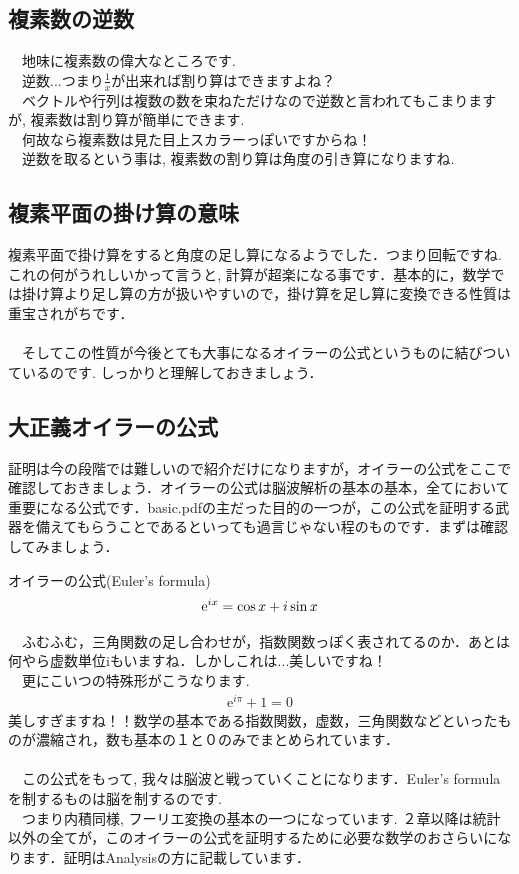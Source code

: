 \documentclass[11pt,a4paper,uplatex]{ujreport}
\begin{document}
\subsection{複素数の逆数}
　地味に複素数の偉大なところです.\\
　逆数...つまり$\frac{1}{x}$が出来れば割り算はできますよね？\\
　ベクトルや行列は複数の数を束ねただけなので逆数と言われてもこまりますが, 複素数は割り算が簡単にできます. \\
　何故なら複素数は見た目上スカラーっぽいですからね！\\
　逆数を取るという事は, 複素数の割り算は角度の引き算になりますね.\\

\subsection{複素平面の掛け算の意味}
複素平面で掛け算をすると角度の足し算になるようでした．つまり回転ですね. これの何がうれしいかって言うと, 計算が超楽になる事です．基本的に，数学では掛け算より足し算の方が扱いやすいので，掛け算を足し算に変換できる性質は重宝されがちです．\\
\\
　そしてこの性質が今後とても大事になるオイラーの公式というものに結びついているのです. しっかりと理解しておきましょう．
\subsection{大正義オイラーの公式}
証明は今の段階では難しいので紹介だけになりますが，オイラーの公式をここで確認しておきましょう．オイラーの公式は脳波解析の基本の基本，全てにおいて重要になる公式です．basic.pdfの主だった目的の一つが，この公式を証明する武器を備えてもらうことであるといっても過言じゃない程のものです．まずは確認してみましょう．

\begin{screen}
オイラーの公式(Euler's formula)
\begin{eqnarray}
\mathrm{e}^{ix} = \cos x + \mathstrut i\sin x
\label{eq:euler}
\end{eqnarray}
\end{screen}

　ふむふむ，三角関数の足し合わせが，指数関数っぽく表されてるのか．あとは何やら虚数単位iもいますね．しかしこれは...美しいですね！\\
　更にこいつの特殊形がこうなります.\\
\begin{eqnarray}
\mathrm{e}^{i\pi} + 1 = 0
\end{eqnarray}
美しすぎますね！！数学の基本である指数関数，虚数，三角関数などといったものが濃縮され，数も基本の１と０のみでまとめられています．\\
\\
　この公式をもって, 我々は脳波と戦っていくことになります．Euler's formula を制するものは脳を制するのです.\\
　つまり内積同様, フーリエ変換の基本の一つになっています. ２章以降は統計以外の全てが，このオイラーの公式を証明するために必要な数学のおさらいになります．証明はAnalysisの方に記載しています．
\end{document}
